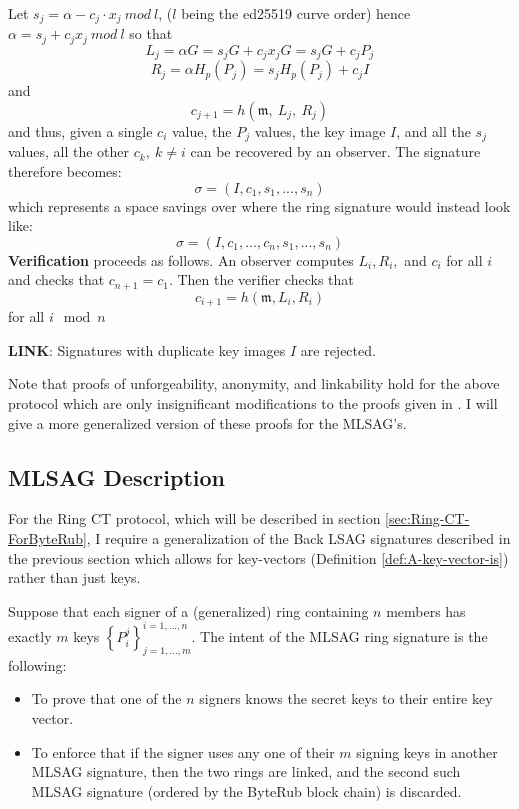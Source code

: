 \documentclass[12pt,oneside,english]{amsart}
\numberwithin{equation}{section}
\numberwithin{figure}{section}
\theoremstyle{plain}
\theoremstyle{plain}
\theoremstyle{remark}
\theoremstyle{plain}
\theoremstyle{remark}
\theoremstyle{remark}
\theoremstyle{plain}
\theoremstyle{definition}
\begin{document}
Let $s_{j}=\alpha-c_{j}\cdot x_j\ mod\ l$, ($l$ being the ed25519
curve order) hence $\alpha=s_{j}+c_{j}x_j\ mod\ l$ so that 
\[
L_{j}=\alpha G=s_{j}G+c_{j}x_jG=s_{j}G+c_{j}P_{j}
\]
\[
R_{j}=\alpha 
H_p\left(P_{j}\right)=s_{j}H_p\left(P_{j}\right)+c_{j}I
\]
and 
\[
c_{j+1}=h\left(\mathfrak{m},\ L_{j},\ R_{j}\right)
\]
 and thus, given a single $c_{i}$ value, the $P_{j}$ values, the
key image $I$, and all the $s_{j}$ values, all the other $c_{k},\ k\neq i$
can be recovered by an observer. The signature therefore becomes:
\[
\sigma=\left(I,c_{1},s_{1},...,s_{n}\right)
\]
 which represents a space savings over \cite[4.4]{CN} where the ring signature would instead look like: 
 \[
\sigma=\left(I,c_{1}, ..., c_{n},s_{1},...,s_{n}\right)
\]
\textbf{Verification }proceeds as follows. An observer computes $L_{i},R_{i},$
and $c_{i}$ for all $i$ and checks that $c_{n+1}=c_{1}$. Then the
verifier checks that 
\[
c_{i+1}=h\left(\mathfrak{m},L_{i},R_{i}\right)
\]
 for all $i\mod n$ 

\textbf{LINK}: Signatures with duplicate key images $I$ are rejected. 

Note that proofs of unforgeability, anonymity, and linkability
hold for the above protocol which are only insignificant modifications to the proofs
given in \cite{LWW}. I will give a more generalized version of these
proofs for the MLSAG's. 
\subsection{\label{sub:MLSAG-Description}MLSAG Description}


For the Ring CT protocol, which will be described in section
\ref{sec:Ring-CT-ForByteRub}, I require a generalization of the Back
LSAG signatures described in the previous section which allows for key-vectors (Definition
\ref{def:A-key-vector-is}) rather than just keys. 


Suppose that each signer of a (generalized) ring containing $n$
members has exactly $m$ keys $\left\{ P_{i}^{j}\right\} _{j=1,...,m}^{i=1,...,n}$.
The intent of the MLSAG ring signature is the following: 
\begin{itemize}
\item To prove that one of the $n$ signers knows the secret keys to their entire key vector. 
\item To enforce that if the signer uses any one of their $m$ signing keys in another MLSAG
signature, then the two rings are linked, and the second such MLSAG signature (ordered by the ByteRub block chain) is discarded. 
\end{itemize}
\end{document}
